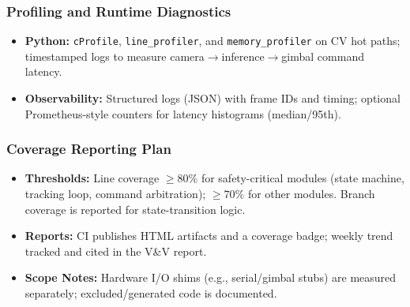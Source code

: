 \documentclass[12pt, titlepage]{article}
\begin{document}
\subsubsection*{Profiling and Runtime Diagnostics}
\begin{itemize}
  \item \textbf{Python:} \texttt{cProfile}, \texttt{line\_profiler}, and 
  \texttt{memory\_profiler} on CV hot paths; timestamped logs to measure 
  camera$\rightarrow$inference$\rightarrow$gimbal command latency.
  \item \textbf{Observability:} Structured logs (JSON) with frame IDs and timing; 
  optional Prometheus-style counters for latency histograms (median/95th).
\end{itemize}

\subsubsection*{Coverage Reporting Plan}
\begin{itemize}
  \item \textbf{Thresholds:} Line coverage $\geq 80\%$ for safety-critical 
  modules (state machine, tracking loop, command arbitration); $\geq 70\%$ for other 
  modules. Branch coverage is reported for state-transition logic.
  \item \textbf{Reports:} CI publishes HTML artifacts and a coverage badge; weekly trend 
  tracked and cited in the V\&V report.
  \item \textbf{Scope Notes:} Hardware I/O shims (e.g., serial/gimbal stubs) are measured 
  separately; excluded/generated code is documented.
\end{itemize}



\end{document}
